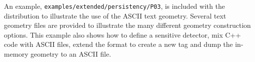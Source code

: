 An example, \verb"examples/extended/persistency/P03", is included with the 
\Gfour{} distribution to illustrate the use of the ASCII text geometry.  Several
text geometry files are provided to illustrate the many different geometry
construction options.
This example also shows how to define a sensitive detector, mix C++ code with
ASCII files, extend the format to create a new tag and dump the in-memory 
geometry to an ASCII file.

